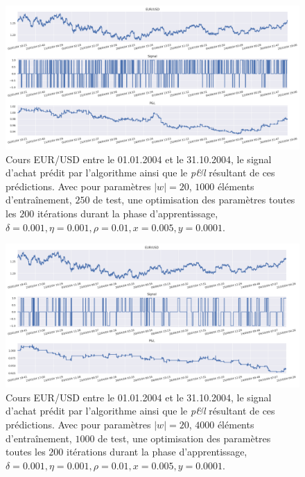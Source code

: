 \documentclass[a4paper, 11pt]{article}
\begin{document}
\begin{figure}
	\centering
	\includegraphics[scale=0.5]{res/eursud_2004-2005_size_1000-250}
	\caption{Cours EUR/USD entre le 01.01.2004 et le 31.10.2004, le signal d'achat prédit par l'algorithme ainsi que le \textit{p\&l} résultant de ces prédictions. Avec pour paramètres $|w| = 20$, $1000$ éléments d'entraînement, $250$ de test, une optimisation des
		paramètres toutes les $200$ itérations durant la phase d'apprentissage, $\delta = 0.001, \eta=0.001,\rho=0.01, x = 0.005, y=0.0001$.}
	\label{eurusd 2004 2005 1M 1000 250}
\end{figure}

\begin{figure}
		\centering
	\includegraphics[scale=0.5]{res/eursud_2004-2005_size_4000-1000}
	\caption{Cours EUR/USD entre le 01.01.2004 et le 31.10.2004, le signal d'achat prédit par l'algorithme ainsi que le \textit{p\&l} résultant de ces prédictions. Avec pour paramètres $|w| = 20$, $4000$ éléments d'entraînement, $1000$ de test, une optimisation des
		paramètres toutes les $200$ itérations durant la phase d'apprentissage, $\delta = 0.001, \eta=0.001,\rho=0.01, x = 0.005, y=0.0001$.}
	\label{eurusd 2004 2005 1M 4000-1000}
\end{figure}
\clearpage
\end{document}
